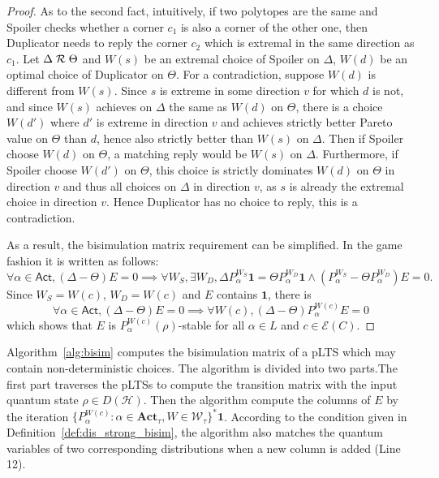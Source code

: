 \documentclass[runningheads]{llncs}
\begin{document}
\begin{proposition}
\begin{proof}
As to the second fact, intuitively, if two polytopes are the same and Spoiler checks whether a corner $c_{1}$ is also a corner of the other one, then Duplicator needs to reply the corner $c_{2}$ which is extremal in the same direction as $c_{1}$. Let $\Delta\mathrel{{\mathcal R }}\Theta$ and $W(s)$ be an extremal choice of Spoiler on $\Delta$, $W(d)$ be an optimal choice of Duplicator on $\Theta$. For a contradiction, suppose $W(d)$ is different from $W(s)$. Since $s$ is extreme in some direction $v$ for which $d$ is not, and since $W(s)$ achieves on $\Delta$ the same as $W(d)$ on $\Theta$, there is a choice $W(d')$ where $d'$ is extreme in direction $v$ and achieves strictly better Pareto value on $\Theta$ than $d$, hence also strictly better than $W(s)$ on $\Delta$. Then if Spoiler choose $W(d)$ on $\Theta$, a matching reply would be $W(s)$ on $\Delta$. Furthermore, if Spoiler choose $W(d')$ on $\Theta$, this choice is strictly dominates $W(d)$ on $\Theta$ in direction $v$ and thus all choices on $\Delta$ in direction $v$, as $s$ is already the extremal choice in direction $v$. Hence Duplicator has no choice to reply, this is a contradiction.

As a result, the bisimulation matrix requirement can be simplified. In the game fashion it is written as follows:
\[\forall\alpha\in\mathsf{Act}, (\Delta-\Theta)E=0\implies\forall W_{S},\exists W_{D},\Delta P^{W_{S}}_{\alpha}\textbf{1}=\Theta P^{W_{D}}_{\alpha}\textbf{1}\wedge(P^{W_{S}}_{\alpha}-\Theta P^{W_{D}}_{\alpha})E=0.\]
Since $W_{S}=W(c)$, $W_{D}=W(c)$ and $E$ contains $\textbf{1}$, there is
\[\forall\alpha\in\mathsf{Act}, (\Delta-\Theta)E=0\implies\forall W(c), (\Delta-\Theta) P^{W(c)}_{\alpha}E=0\]
which shows that $E$ is $P^{W(c)}_{\alpha}(\rho)$-stable for all $\alpha\in L$ and $c\in\mathcal{E}(C)$.
\end{proof}
\end{proposition}

Algorithm~\ref{alg:bisim} computes the bisimulation matrix of a pLTS which may contain non-deterministic choices. The algorithm is divided into two parts.The first part traverses the pLTSs to compute the transition matrix with the input quantum state $\rho\in D(\mathcal{H})$. Then the algorithm compute the columns of $E$ by the iteration $\{P^{W(c)}_{\alpha}:\alpha\in\textbf{Act}_{\tau},W\in\mathcal{W}_{\tau}\}^*\textbf{1}$. According to the condition given in Definition~\ref{def:dis_strong_bisim}, the algorithm also matches the quantum variables of two corresponding distributions when a new column is added (Line 12).
\end{document}
